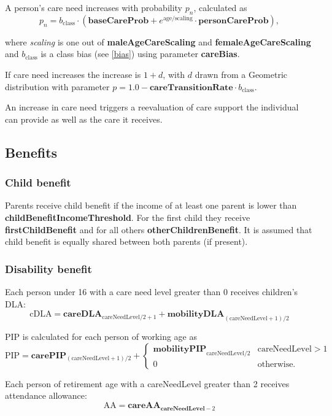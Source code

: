 \documentclass{article}
\newcommand{\marginnote}[1]{\protect\marginpar{\small\texttt{#1}}}
\begin{document}
A person's care need increases with probability $p_n$, calculated as
\[
p_n = b_\textrm{class} \cdot (\textbf{baseCareProb} + e^{\textrm{age}/\textrm{scaling}} \cdot \textbf{personCareProb} ),
\]

where \textit{scaling} is one out of \textbf{maleAgeCareScaling} and \textbf{femaleAgeCareScaling} and $b_\textrm{class}$ is a class bias (see \ref{bias}) using parameter \textbf{careBias}.

If care need increases the increase is $1+d$, with $d$ drawn from a Geometric distribution with parameter $p=1.0 - \textbf{careTransitionRate}\cdot b_\textrm{class}$.

An increase in care need triggers a reevaluation of care support the individual can provide as well as the care it receives.

\subsection{Benefits \marginnote{Benefits.jl}}


\subsubsection*{Child benefit}

Parents receive child benefit if the income of at least one parent is lower than \textbf{childBenefitIncomeThreshold}. For the first child they receive \textbf{firstChildBenefit} and for all others \textbf{otherChildrenBenefit}. It is assumed that child benefit is equally shared between both parents (if present).

\subsubsection*{Disability benefit}

Each person under 16 with a care need level greater than 0 receives children's DLA:
\[
\textrm{cDLA} = \textbf{careDLA}_{\textrm{careNeedLevel}/2+1} + \textbf{mobilityDLA}_{(\textrm{careNeedLevel}+1)/2}
\]

PIP is calculated for each person of working age as
\[
\textrm{PIP} = \textbf{carePIP}_{(\textrm{careNeedLevel}+1)/2} +
	\left\{\begin{array}{ll}
		\textbf{mobilityPIP}_{\textrm{careNeedLevel}/2} & \textrm{careNeedLevel}>1\\
		0 & \textrm{otherwise.}
		\end{array}\right.
\]

Each person of retirement age with a \textsf{careNeedLevel} greater than 2 receives attendance allowance:
\[
\textrm{AA} = \textbf{careAA}_{\textbf{careNeedLevel}-2}
\]
\end{document}
